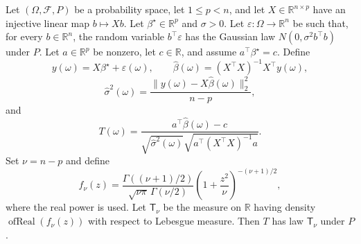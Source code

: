 \begin{theorem}
Let $(\Omega,\mathcal F,P)$ be a probability space, let $1\le p<n$, and
let $X\in\mathbb R^{n\times p}$ have an injective linear map
$b\mapsto Xb$.  Let $\beta^\star\in\mathbb R^p$ and $\sigma>0$.  Let
$\varepsilon:\Omega\to\mathbb R^n$ be such that, for every
$b\in\mathbb R^n$, the random variable $b^\top\varepsilon$ has the
Gaussian law $N(0,\sigma^2b^\top b)$ under $P$.  Let
$a\in\mathbb R^p$ be nonzero, let $c\in\mathbb R$, and assume
$a^\top\beta^\star=c$.  Define
\[
  y(\omega)=X\beta^\star+\varepsilon(\omega),
  \qquad
  \widehat\beta(\omega)=(X^\top X)^{-1}X^\top y(\omega),
\]
\[
  \widehat\sigma^2(\omega)
  =\frac{\|y(\omega)-X\widehat\beta(\omega)\|_2^2}{n-p},
\]
and
\[
  T(\omega)=
  \frac{a^\top\widehat\beta(\omega)-c}
  {\sqrt{\widehat\sigma^2(\omega)}
   \sqrt{a^\top(X^\top X)^{-1}a}}.
\]
Set $\nu=n-p$ and define
\[
  f_\nu(z)=
  \frac{\Gamma((\nu+1)/2)}
       {\sqrt{\nu\pi}\,\Gamma(\nu/2)}
  \left(1+\frac{z^2}{\nu}\right)^{-(\nu+1)/2},
\]
where the real power is used.  Let $\mathsf T_\nu$ be the measure on
$\mathbb R$ having density $\operatorname{ofReal}(f_\nu(z))$ with respect
to Lebesgue measure.  Then $T$ has law $\mathsf T_\nu$ under $P$.
\end{theorem}
